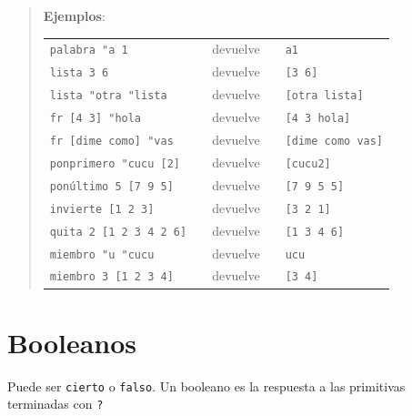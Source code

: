 \begin{quote}
\noindent \textbf{Ejemplos}:
\begin{longtable}{lcccl}
 \verb+palabra "a 1+            & & devuelve & & \texttt{a1}    \\
 \texttt{lista 3 6}             & & devuelve & & \texttt{[3 6]} \\
 \verb+lista "otra "lista+      & & devuelve & & \texttt{[otra lista]} \\
 \verb+fr [4 3] "hola+          & & devuelve & & \texttt{[4 3 hola]} \\
 \verb+fr [dime como] "vas+     & & devuelve & & \texttt{[dime como vas]} \\
 \verb+ponprimero "cucu [2]+    & & devuelve & & \texttt{[cucu2]} \\
 \texttt{pon\'ultimo 5 [7 9 5]}   & & devuelve & & \texttt{[7 9 5 5]} \\
 \texttt{invierte [1 2 3]}      & & devuelve & & \texttt{[3 2 1]} \\
 \texttt{quita 2 [1 2 3 4 2 6]} & & devuelve & & \texttt{[1 3 4 6]} \\
 \verb+miembro "u "cucu+      & & devuelve & & \texttt{ucu} \\
 \texttt{miembro 3 [1 2 3 4]} & & devuelve & & \texttt{[3 4]} 
\end{longtable} \end{quote}

\section{Booleanos}
   \label{Booleanos}

\noindent
Puede ser \texttt{cierto} o \texttt{falso}. Un booleano es la respuesta
a las primitivas terminadas con \verb*+?+ 

